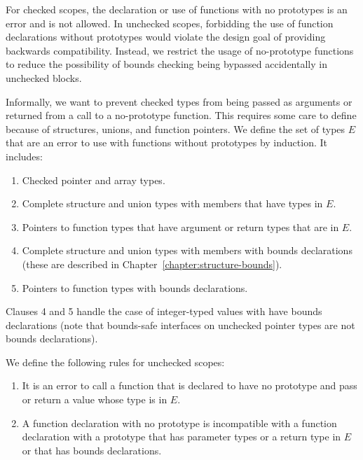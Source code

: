 For checked scopes, the declaration or use of functions with no prototypes is an error
and is not allowed.   In unchecked scopes, forbidding the use of function
declarations without prototypes would violate the design goal of providing backwards compatibility.
Instead, we restrict the usage of no-prototype functions to reduce the possibility of
bounds checking being bypassed accidentally in unchecked blocks.

Informally, we want to prevent checked types from being passed as arguments or returned from a
call to a no-prototype function.  This requires some care to define because of structures,
unions, and function pointers. We define the set of types $E$ that are an error to use with
functions without prototypes by induction.  It includes:
\begin{enumerate}
\item Checked pointer and array types.
\item Complete structure and union types with members that have types in $E$.
\item Pointers to function types that have argument or return types that are in $E$.
\item Complete structure and union types with members with bounds declarations (these
      are described in Chapter~\ref{chapter:structure-bounds}).
\item Pointers to function types with bounds declarations.
\end{enumerate}
Clauses 4 and 5 handle the case of integer-typed values with have bounds declarations
(note that bounds-safe interfaces on unchecked pointer types are not bounds declarations).

We define the following rules for unchecked scopes:
\begin{enumerate}
\item It is an error to call a function that is
declared to have no prototype and pass or return a value whose type is in $E$.
\item A function declaration with no prototype is incompatible with a function declaration
with a prototype that has parameter types or a return type in $E$ or that has bounds
declarations.
\end{enumerate}

